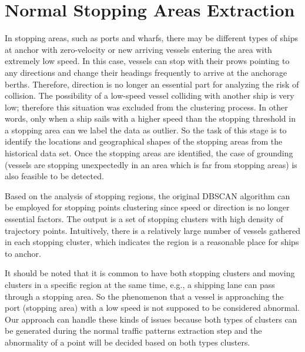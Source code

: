 \documentclass[12pt,glossary]{dalcsthesis}
\begin{document}

\section{Normal Stopping Areas Extraction}
\label{sec:normal_stopping_model}

In stopping areas, such as ports and wharfs, there may be different types of ships at anchor with zero-velocity or new arriving vessels entering the area with extremely low speed. In this case, vessels can stop with their prows pointing to any directions and change their headings frequently to arrive at the anchorage berths. Therefore, direction is no longer an essential part for analyzing the risk of collision. The possibility of a low-speed vessel colliding with another ship is very low; therefore this situation was excluded from the clustering process. In other words, only when a ship sails with a higher speed than the stopping threshold in a stopping area can we label the data as outlier. So the task of this stage is to identify the locations and geographical shapes of the stopping areas from the historical data set. Once the stopping areas are identified, the case of grounding (vessels are stopping unexpectedly in an area which is far from stopping areas) is also feasible to be detected. 


Based on the analysis of stopping regions,  the original DBSCAN \cite{DBScan96} algorithm can be employed for stopping points clustering since speed or direction is no longer essential factors. The output is a set of stopping clusters with high density of trajectory points. Intuitively, there is a relatively large number of vessels gathered in each stopping cluster, which indicates the region is a reasonable place for ships to anchor. 

It should be noted that it is common to have both stopping clusters and moving clusters in a specific region at the same time, e.g., a shipping lane can pass through a stopping area. So the phenomenon that a vessel is approaching the port (stopping area) with a low speed is not supposed to be considered abnormal.  Our approach can handle these kinds of issues because both types of clusters can be generated during the normal traffic patterns extraction step and the abnormality of a point will be decided based on both types clusters.
\end{document}
